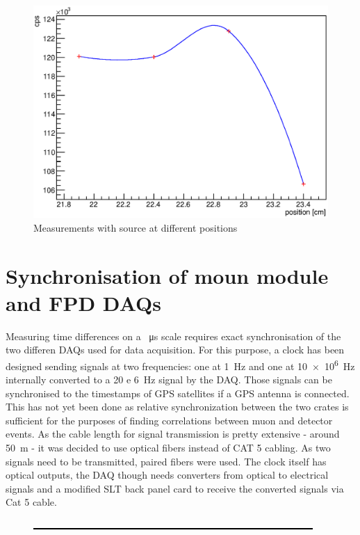 \begin{figure}
\begin{minipage}[d]{0.24 \textwidth}
	\end{minipage}
	\begin{minipage}[d]{0.24 \textwidth}
		  \includegraphics[width=\textwidth]{graphics/cobalt/modules/8B.eps}
	\end{minipage}
	
	
  	\caption{Measurements with source at different positions}
  	\label{fig:SrRatesPMT}
  \end{figure}

  \section{Synchronisation of moun module and FPD DAQs}
  \label{ch:Analysis:sec:Synchronisation of moun module and FPD DAQs}
  Measuring time differences on a \SI{}{\micro\second} scale requires exact synchronisation of the two differen DAQs used for data acquisition. For this purpose, a clock has been designed sending signals at two frequencies: one at \SI{1}{\hertz} and one at \SI{10e6}{\hertz} internally converted to a \SI{20 e 6}{\hertz} signal by the DAQ. Those signals can be synchronised to the timestamps of GPS satellites if a GPS antenna is connected. This has not yet been done as relative synchronization between the two crates is sufficient for the purposes of finding correlations between muon and detector events. As the cable length for signal transmission is pretty extensive - around \SI{50}{\meter} - it was decided to use optical fibers instead of CAT 5 cabling. As two signals need to be transmitted, paired  fibers were used. The clock itself has optical outputs, the DAQ though needs converters from optical to electrical signals and a modified SLT back panel card to receive the converted 
signals via Cat 5 cable.
  \begin{figure}
  	\includegraphics[width = 0.9 \textwidth]{graphics/dummy.eps}
  \end{figure}

